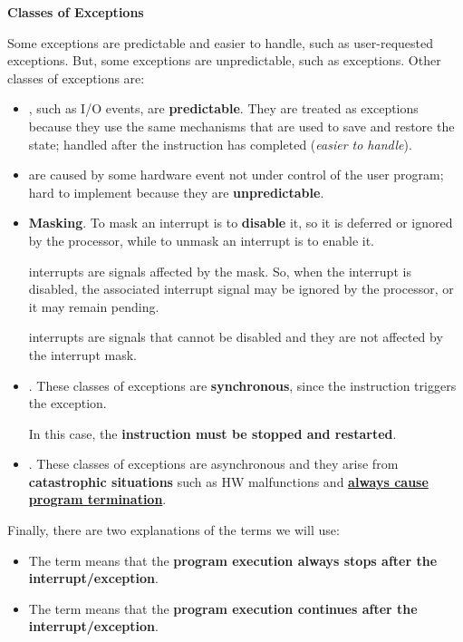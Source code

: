 \begin{flushleft}
    \textcolor{Green4}{ \textbf{Classes of Exceptions}}
\end{flushleft}
Some exceptions are predictable and easier to handle, such as user-requested exceptions. But, some exceptions are unpredictable, such as  exceptions. Other classes of exceptions are:
\begin{itemize}
    \item {}, such as I/O events, are \textbf{predictable}. They are treated as exceptions because they use the same mechanisms that are used to save and restore the state; handled after the instruction has completed (\emph{easier to handle}).
    

    \item {} are caused by some hardware event not under control of the user program; hard to implement because they are \textbf{unpredictable}.
    

    \item \textbf{Masking}. To mask an interrupt is to \textbf{disable} it, so it is deferred or ignored by the processor, while to unmask an interrupt is to enable it.
    
     interrupts are signals affected by the mask. So, when the interrupt is disabled, the associated interrupt signal may be ignored by the processor, or it may remain pending.

     interrupts are signals that cannot be disabled and they are not affected by the interrupt mask.


    \item {}. These classes of exceptions are \textbf{synchronous}, since the instruction triggers the exception. 
    
    In this case, the \textbf{instruction must be stopped and restarted}.


    \item {}. These classes of exceptions are asynchronous and they arise from \textbf{catastrophic situations} such as HW malfunctions and \textbf{\underline{always cause program termination}}.
\end{itemize}
Finally, there are two explanations of the terms we will use:
\begin{itemize}
    \item The term  means that the \textbf{program execution always stops after the interrupt/exception}.
    
    \item The term  means that the \textbf{program execution continues after the interrupt/exception}.
\end{itemize}